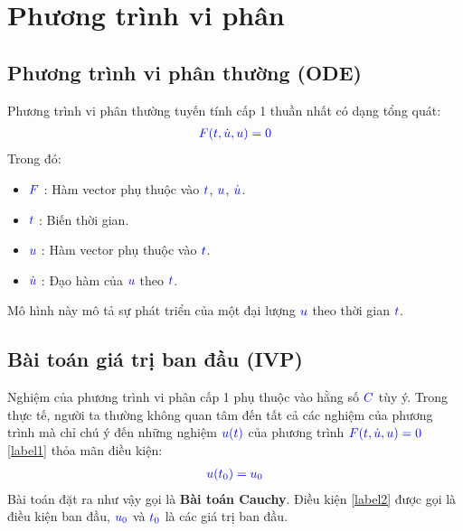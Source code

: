 \documentclass[a4paper]{article}
\begin{document}

\newpage
\tableofcontents
\newpage

\section{Phương trình vi phân}
    \subsection{Phương trình vi phân thường (ODE)}
    Phương trình vi phân thường tuyến tính cấp 1 thuần nhất có dạng tổng quát:
        \begin{align}
	        \textcolor{blue}{F(t, \dot u, u) = 0} \label{label1}
	    \end{align}
    Trong đó:

    \begin{itemize}
        \item $\textcolor{blue}{F}$ : Hàm vector phụ thuộc vào $\textcolor{blue}{t}$, $\textcolor{blue}{u}$, $\textcolor{blue}{\dot u}$.
        \item $\textcolor{blue}{t}$ : Biến thời gian.
        \item $\textcolor{blue}{u}$ : Hàm vector phụ thuộc vào $\textcolor{blue}{t}$.
        \item $\textcolor{blue}{\dot u}$ : Đạo hàm của $\textcolor{blue}{u}$ theo $\textcolor{blue}{t}$.
    \end{itemize}

    Mô hình này mô tả sự phát triển của một đại lượng $\textcolor{blue}{u}$ theo thời gian $\textcolor{blue}{t}$.
    
    \subsection{Bài toán giá trị ban đầu (IVP)}
    Nghiệm của phương trình vi phân cấp 1 phụ thuộc vào hằng số $\textcolor{blue}{C}$ tùy ý. Trong thực tế, người ta thường không quan tâm đến tất cả các nghiệm của phương trình mà chỉ chú ý đến những nghiệm $\textcolor{blue}{u(t)}$ của phương trình $\textcolor{blue}{F(t, \dot u, u) = 0}$ \eqref{label1} thỏa mãn điều kiện:
    \begin{align}
        \textcolor{blue}{u(t_{0}) = u_{0}} \label{label2}
    \end{align}
    Bài toán đặt ra như vậy gọi là {\bfseries Bài toán Cauchy}. Điều kiện \eqref{label2} được gọi là điều kiện ban đầu, $\textcolor{blue}{u_{0}}$ và $\textcolor{blue}{t_{0}}$ là các giá trị ban đầu.
    
\end{document}
